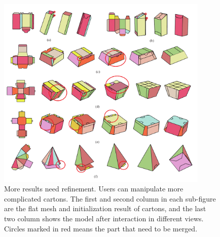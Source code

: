 \begin{figure}
	\centering
	\includegraphics[width=0.9\textwidth]{images/newMore}
	\caption{More results need refinement. Users can manipulate more complicated cartons. The first and second column in each sub-figure are the flat mesh and initialization result of cartons, and the last two column shows the model after interaction in  different views. Circles marked in red means the part that need to be merged.}
	\label{fig:result-more}
\end{figure}